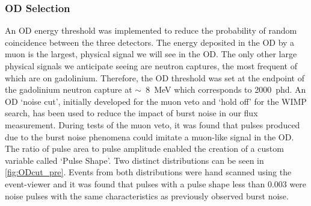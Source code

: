 \subsubsection{OD Selection}
An OD energy threshold was implemented to reduce the probability of random coincidence between the three detectors. The energy deposited in the OD by a muon is the largest, physical signal we will see in the OD. The only other large physical signals we anticipate seeing are neutron captures, the most frequent of which are on gadolinium. Therefore, the OD threshold was set at the endpoint of the gadolinium neutron capture at $\sim$~8~MeV which corresponds to 2000~phd.
An OD `noise cut', initially developed for the muon veto and `hold off' for the WIMP search, has been used to reduce the impact of burst noise in our flux measurement. During tests of the muon veto, it was found that pulses produced due to the burst noise phenomena could imitate a muon-like signal in the OD. The ratio of pulse area to pulse amplitude enabled the creation of a custom variable called `Pulse Shape'.
Two distinct distributions can be seen in \autoref{fig:ODcut_pre}. Events from both distributions were hand scanned using the event-viewer and it was found that pulses with a pulse shape less than 0.003 were noise pulses with the same characteristics as previously observed burst noise. 
